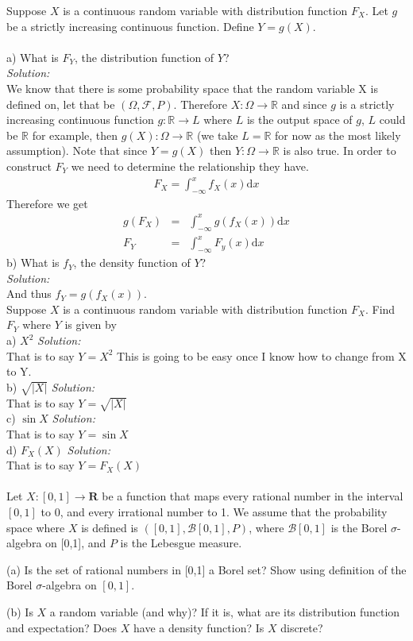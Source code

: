 \documentclass[10pt]{amsart}
\newcommand{\D}{\mathrm{d}}
\begin{document}
 Suppose $X$ is a continuous random variable with distribution function $F_X$. Let $g$ be a strictly increasing continuous function. Define $Y=g(X)$. \\ \\
\noindent
a) What is $F_Y$, the distribution function of $Y$? \\
\textit{Solution:} \\
We know that there is some probability space that the random variable X is defined on, let that be $(\Omega, \mathcal{F},P)$.
Therefore $X: \Omega \rightarrow \mathbb{R}$ and since $g$ is a strictly increasing continuous function $g: \mathbb{R} \rightarrow L$ where $L$ is the output space of $g$, $L$ could be $\mathbb{R}$ for example, then $g(X): \Omega \rightarrow \mathbb{R}$ (we take $L = \mathbb{R}$ for now as the most likely assumption).
Note that since $Y = g(X)$ then $Y: \Omega \rightarrow \mathbb{R}$ is also true.
In order to construct $F_Y$ we need to determine the relationship they have.
\begin{eqnarray*}
F_X = \int_{-\infty}^{x} f_X(x)\D x
\end{eqnarray*}
Therefore we get 
\begin{eqnarray*}
g(F_X) &=& \int_{-\infty}^{x} g(f_X(x))\D x \\
F_Y &=& \int_{-\infty}^{x} F_y(x)\D x
\end{eqnarray*}
b) What is $f_Y$, the density function of $Y$? \\
\textit{Solution:} \\
And thus $f_Y = g(f_X(x))$.
\\

 Suppose $X$ is a continuous random variable with distribution function $F_X$. Find $F_Y$ where $Y$ is given by \\

\noindent a) $X^2$ \textit{Solution:} \\
That is to say $Y = X^2$ This is going to be easy once I know how to change from X to Y. \\
\noindent b) $\sqrt{|X|}$ \textit{Solution:} \\
That is to say $Y = \sqrt{|X|}$ \\
\noindent c) $\sin X$ \textit{Solution:} \\
That is to say $Y = \sin X$ \\
\noindent d) $F_X(X)$ \textit{Solution:} \\
That is to say $Y = F_X(X)$ \\
\\

  Let $X: [0,1] \to \mathbf{R}$ be a function that maps every rational number in the interval $[0,1]$ to 0, and every irrational number to 1. We assume that the probability space where $X$ is defined is $([0,1],\mathcal{B}[0,1],P)$, where $\mathcal{B}[0,1]$ is the Borel $\sigma$-algebra on [0,1], and $P$ is the Lebesgue measure. 

(a) Is the set of rational numbers in [0,1] a Borel set? Show using definition of the Borel  $\sigma$-algebra on $[0,1]$. 

(b) Is $X$ a random variable (and why)? If it is, what are its distribution function and expectation? Does $X$ have a density function? Is $X$ discrete?
\end{document}
